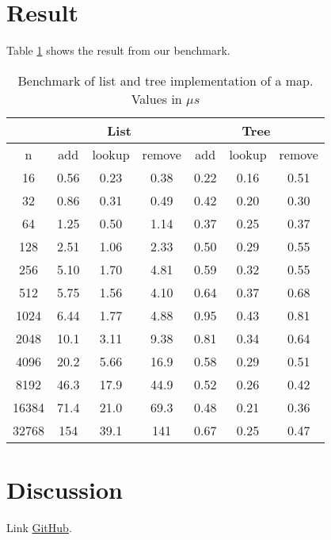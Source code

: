 \documentclass[a4paper,11pt]{article}
\begin{document}
\section*{Result}
Table \ref{table:bench} shows the result from our benchmark.
\begin{table}[h]
    \centering
    \begin{tabular}{|c c|c|c|c|c|c|}
        \hline
         & \multicolumn{3}{c|}{List} & \multicolumn{3}{|c|}{Tree} \\ \hline
        n & add & lookup & remove & add & lookup & remove  \\ \hline
        16   &     0.56   &     0.23   &     0.38    & 0.22      &0.16      & 0.51    \\
        32   &     0.86   &     0.31   &     0.49  &   0.42    &   0.20   &    0.30  \\ 
        64   &     1.25   &     0.50   &     1.14  &    0.37   &     0.25 &    0.37  \\ 
       128   &     2.51   &     1.06   &     2.33  &     0.50  &    0.29  &    0.55 \\ 
       256   &     5.10   &     1.70   &     4.81  &     0.59  &    0.32  &     0.55 \\ 
       512   &     5.75   &     1.56   &     4.10  &      0.64 &    0.37  &     0.68 \\ 
      1024   &     6.44   &     1.77   &     4.88  &      0.95 &    0.43  &     0.81 \\ 
      2048   &    10.1   &     3.11   &     9.38  &     0.81  &     0.34 &     0.64 \\ 
      4096   &    20.2   &     5.66   &    16.9  &      0.58 &     0.29 &     0.51 \\ 
      8192   &    46.3   &    17.9   &    44.9  &      0.52 &     0.26 &     0.42 \\ 
     16384   &    71.4   &    21.0   &    69.3  &      0.48 &     0.21 &     0.36 \\ 
     32768   &   154   &    39.1   &   141  &           0.67     &  0.25    &  0.47    \\ \hline
    \end{tabular}
\caption{Benchmark of list and tree implementation of a map. \\Values in $\mu s$}
\label{table:bench}
\end{table}

\FloatBarrier
\section*{Discussion}
Link
\href{https://github.com/adrian-jonsson-sjoedin/ID1019-Programming-II/tree/main/Task2_Solution}{GitHub}.
\end{document}
